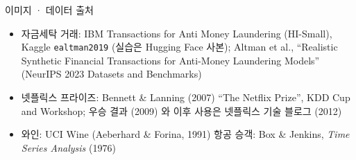 \documentclass[aspectratio=169,11pt]{beamer}
\begin{document}
\begin{frame}{이미지 · 데이터 출처}
\vfill
\small
\begin{itemize}
\item 자금세탁 거래: IBM Transactions for Anti Money Laundering (HI-Small), Kaggle \texttt{ealtman2019} (실습은 Hugging Face 사본); Altman et al., ``Realistic Synthetic Financial Transactions for Anti-Money Laundering Models'' (NeurIPS 2023 Datasets and Benchmarks)
\item 넷플릭스 프라이즈: Bennett \& Lanning (2007) ``The Netflix Prize'', KDD Cup and Workshop; 우승 결과 (2009) 와 이후 사용은 넷플릭스 기술 블로그 (2012)
\item 와인: UCI Wine (Aeberhard \& Forina, 1991) \quad 항공 승객: Box \& Jenkins, \textit{Time Series Analysis} (1976)
\end{itemize}
\vfill
{}
\end{frame}
\end{document}
